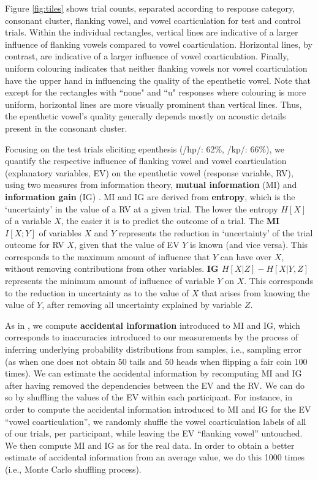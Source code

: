 Figure \ref{fig:tiles} shows trial counts, separated according to response category, consonant cluster, flanking vowel, and vowel coarticulation for test and control trials. Within the individual rectangles, vertical lines are indicative of a larger influence of flanking vowels compared to vowel coarticulation. Horizontal lines, by contrast, are indicative of a larger influence of vowel coarticulation. Finally, uniform colouring indicates that neither flanking vowels nor vowel coarticulation have the upper hand in influencing the quality of the epenthetic vowel. Note that except for the rectangles with ``none" and ``u" responses where colouring is more uniform, horizontal lines are more visually prominent than vertical lines. Thus, the epenthetic vowel's quality generally depends mostly on acoustic details present in the consonant cluster. 

Focusing on the test trials eliciting epenthesis (/hp/: 62\%, /kp/: 66\%), we quantify the respective influence of flanking vowel and vowel coarticulation (explanatory variables, EV) on the epenthetic vowel (response variable, RV), using two measures from information theory, \textbf{mutual information} (MI) and \textbf{information gain} (IG) \cite[see][for a comprehensive description of these measures]{daland2015}. MI and IG are derived from \textbf{entropy}, which is the `uncertainty' in the value of a RV at a given trial. The lower the entropy $H[X]$ of a variable $X$, the easier it is to predict the outcome of a trial. The \textbf{MI $I[X;Y]$} of variables $X$ and $Y$ represents the reduction in `uncertainty' of the trial outcome for RV $X$, given that the value of EV $Y$ is known (and vice versa). This corresponds to the maximum amount of influence that $Y$ can have over $X$, without removing contributions from other variables. \textbf{IG $H[X|Z] - H[X|Y,Z]$} represents the minimum amount of influence of variable $Y$ on $X$. This corresponds to the reduction in uncertainty as to the value of $X$ that arises from knowing the value of $Y$, after removing all uncertainty explained by variable $Z$. 

As in \cite{daland2015}, we compute \textbf{accidental information} introduced to MI and IG, which corresponds to inaccuracies introduced to our measurements by the process of inferring underlying probability distributions from samples, i.e., sampling error (as when one does not obtain 50 tails and 50 heads when flipping a fair coin 100 times).
We can estimate the accidental information by recomputing MI and IG after having removed the dependencies between the EV and the RV. We can do so by shuffling the values of the EV within each participant. For instance, in order to compute the accidental information introduced to MI and IG for the EV ``vowel coarticulation'', we randomly shuffle the vowel coarticulation labels of all of our trials, per participant, while leaving the EV ``flanking vowel'' untouched. We then compute MI and IG as for the real data. In order to obtain a better estimate of accidental information from an average value, we do this 1000 times (i.e., Monte Carlo shuffling process). 

